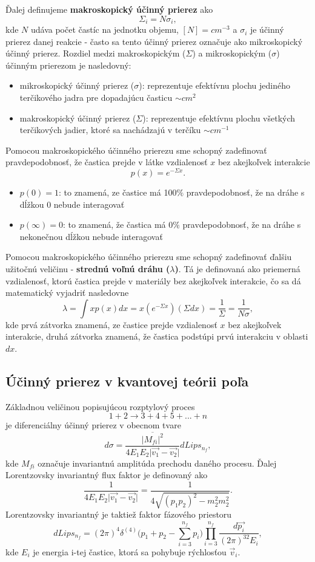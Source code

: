 \documentclass[../../main.tex]{subfiles}
\begin{document}
Ďalej definujeme \textbf{makroskopický účinný prierez} ako 
$$ \Sigma_i = N \sigma_i,$$
kde $N$ udáva počet častíc na jednotku objemu, $[N]=cm^{-3}$ a $\sigma_i$ je účinný prierez danej reakcie - často sa tento účinný prierez označuje ako mikroskopický účinný prierez. Rozdiel medzi makroskopickým ($\Sigma$) a mikroskopickým ($\sigma$) účinným prierezom je nasledovný: 
\begin{itemize}
\item mikroskopický účinný prierez ($\sigma$): reprezentuje efektívnu plochu jediného terčikového jadra pre dopadajúcu časticu $\sim cm^2$
\item makroskopický účinný prierez ($\Sigma$): reprezentuje efektívnu plochu všetkých terčikových jadier, ktoré sa nachádzajú v terčíku $\sim cm^{-1}$
\end{itemize}
 
Pomocou makroskopického účinného prierezu sme schopný zadefinovať pravdepodobnosť, že častica prejde v látke vzdialenosť $x$ bez akejkoľvek interakcie
$$ p(x) = e^{-\Sigma x}.$$
\begin{itemize}
\item $p(0) = 1$: to znamená, ze častice má 100$\%$ pravdepodobnosť, že na dráhe s dĺžkou 0 nebude interagovať 
\item $p(\infty) = 0$: to znamená, že častica má 0$\%$ pravdepodobnosť, že na dráhe s nekonečnou dĺžkou nebude interagovať
\end{itemize}

Pomocou makroskopického účinného prierezu sme schopný zadefinovať ďalšiu užitočnú veličinu - \textbf{strednú voľnú dráhu ($\lambda$)}. Tá je definovaná ako priemerná vzdialenosť, ktorú častica prejde v materiály bez akejkoľvek interakcie, čo sa dá matematický vyjadriť nasledovne
$$ \lambda = \int x p(x) dx = x(e^{-\Sigma x}) (\Sigma dx)  = \frac{1}{\Sigma} = \frac{1}{N\sigma},$$
kde prvá zátvorka znamená, ze častice prejde vzdialenosť $x$ bez akejkoľvek interakcie, druhá zátvorka znamená, že častica podstúpi prvú interakciu v oblasti $dx$.

\subsection{Účinný prierez v kvantovej teórii poľa}
Základnou veličinou popisujúcou rozptylový proces 
$$ 1+2 \rightarrow 3+4+5+...+n $$
je diferenciálny účinný prierez v obecnom tvare
$$ d\sigma = \frac{ \overline{ \vert M_{fi}\vert^2 }}{4E_1E_2\vert \vec{v_1}-\vec{v_2} \vert} dLips_{n_f},$$
kde $M_{fi}$ označuje invariantnú amplitúda prechodu daného procesu. Ďalej Lorentzovsky invariantný flux faktor je definovaný ako 
$$ \frac{1}{4E_1E_2\vert \vec{v_1} - \vec{v_2} \vert} = \frac{1} {4\sqrt{ (p_1p_2)^2 - m_2^2 m_2^2}}.$$
Lorentzovsky invariantný je taktiež faktor fázového priestoru 
$$ dLips_{n_f} = (2\pi)^4\delta^{(4)} \bigg(p_1+p_2-\sum_{i=3}^{n_f}p_i \bigg)\prod_{i=3}^{n_f}\frac{d\vec{p_i}}{(2\pi)^32E_i},$$
kde $E_i$ je energia i-tej častice, ktorá sa pohybuje rýchlosťou $\vec{v}_i$.
\end{document}
